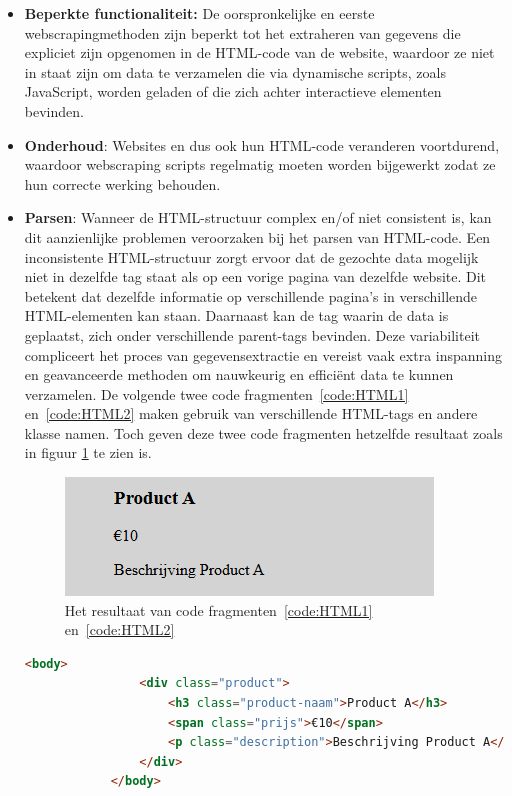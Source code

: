 \begin{itemize}
    \item \textbf{Beperkte functionaliteit: }De oorspronkelijke en eerste webscrapingmethoden zijn beperkt tot het extraheren van gegevens die expliciet zijn opgenomen in de HTML-code van de website, waardoor ze niet in staat zijn om data te verzamelen die via dynamische scripts, zoals JavaScript, worden geladen of die zich achter interactieve elementen bevinden.

    \item \textbf{Onderhoud}: Websites en dus ook hun HTML-code veranderen voortdurend, waardoor webscraping scripts regelmatig moeten worden bijgewerkt zodat ze hun correcte werking behouden.

    \item \textbf{Parsen}: Wanneer de HTML-structuur complex en/of niet consistent is, kan dit aanzienlijke problemen veroorzaken bij het parsen van HTML-code. Een inconsistente HTML-structuur zorgt ervoor dat de gezochte data mogelijk niet in dezelfde tag staat als op een vorige pagina van dezelfde website. Dit betekent dat dezelfde informatie op verschillende pagina's in verschillende HTML-elementen kan staan. Daarnaast kan de tag waarin de data is geplaatst, zich onder verschillende parent-tags bevinden. Deze variabiliteit compliceert het proces van gegevensextractie en vereist vaak extra inspanning en geavanceerde methoden om nauwkeurig en efficiënt data te kunnen verzamelen.
    De volgende twee code fragmenten~\ref{code:HTML1}  en~\ref{code:HTML2} maken gebruik van verschillende HTML-tags en andere klasse namen. Toch geven deze twee code fragmenten hetzelfde resultaat zoals in figuur \ref{fig:inconsistente HTML}  te zien is.

    \begin{figure}[h]
        \centering
        \includegraphics{graphics/HTML-voorbeeld.png}
        \caption{Het resultaat van code fragmenten~\ref{code:HTML1} en~\ref{code:HTML2}}
        \label{fig:inconsistente HTML}
    \end{figure}

    \begin{listing}
        \begin{lstlisting}[language=HTML, caption={HTML voorbeeld 1},label={code:HTML1}]
            <body>
                <div class="product">
                    <h3 class="product-naam">Product A</h3>
                    <span class="prijs">€10</span>
                    <p class="description">Beschrijving Product A</p>
                </div>
            </body>
        \end{lstlisting}


\end{listing}
\end{itemize}
